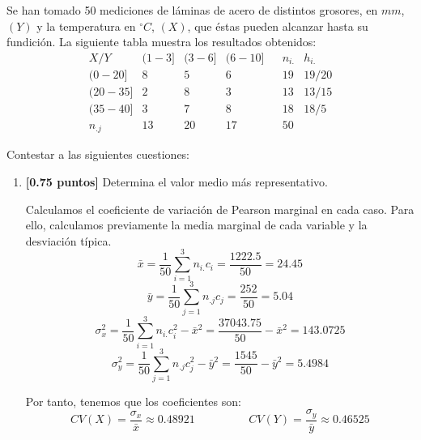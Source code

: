 \documentclass[12pt]{article}
\begin{document}
\begin{ejercicio}
    Se han tomado 50 mediciones de láminas de acero de distintos grosores, en $mm$, $(Y)$ y la temperatura en $^\circ C$, $(X)$, que éstas pueden alcanzar hasta su fundición. La siguiente tabla muestra los resultados obtenidos:
    \begin{equation*}
        \begin{array}{|c|c|c|c||c|c|c}
             \hline X/Y & (1-3] & (3-6] & (6-10] && n_{i.} & h_{i.} \\ \hline
             (0-20] & 8 & 5 & 6 && 19 & {19}/{20} \\
             (20-35] & 2 & 8 & 3 && 13 & {13}/{15} \\
             (35-40] & 3 & 7 & 8 && 18 & {18}/{5}\\ \hline \hline
             n_{.j} & 13 & 20 & 17 && 50
        \end{array}
    \end{equation*}

    Contestar a las siguientes cuestiones:
    \begin{enumerate}
        \item \textbf{[0.75 puntos]} Determina el valor medio más representativo.

        Calculamos el coeficiente de variación de Pearson marginal en cada caso. Para ello, calculamos previamente la media marginal de cada variable y la desviación típica.
        \begin{equation*}
            \bar{x}=\frac{1}{50}\sum_{i=1}^3 n_{i.}c_{i}=\frac{1222.5}{50} = 24.45
        \end{equation*}
        \begin{equation*}
            \bar{y}=\frac{1}{50}\sum_{j=1}^3 n_{.j}c_{j}=\frac{252}{50} = 5.04
        \end{equation*}
        \begin{equation*}
            \sigma_{x}^2=\frac{1}{50}\sum_{i=1}^3 n_{i.}c_{i}^2 - \bar{x}^2=\frac{37043.75}{50} - \bar{x}^2 = 143.0725
        \end{equation*}
        \begin{equation*}
            \sigma_{y}^2=\frac{1}{50}\sum_{j=1}^3 n_{.j}c_{j}^2 - \bar{y}^2=\frac{1545}{50} - \bar{y}^2 = 5.4984
        \end{equation*}

        Por tanto, tenemos que los coeficientes son:
        \begin{equation*}
            CV(X)=\frac{\sigma_x}{\bar{x}}\approx 0.48921
            \hspace{2cm}
            CV(Y)=\frac{\sigma_y}{\bar{y}}\approx 0.46525
        \end{equation*}


\end{enumerate}
\end{ejercicio}
\end{document}
